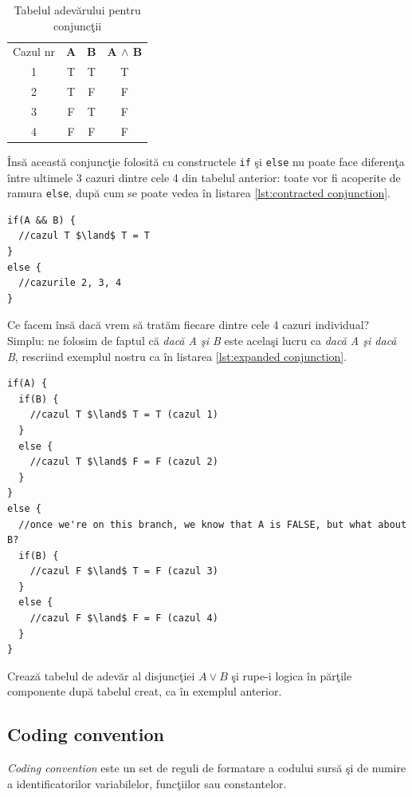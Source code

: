 \begin{table}[htp]
  \begin{center}
  \begin{tabular}{cccc}
  Cazul nr & \textbf{A} & \textbf{B} & \textbf{A $\land$ B}\\
  1 & T & T & T\\
  2 & T & F & F\\
  3 & F & T & F\\
  4 & F & F & F
  \end{tabular}
  \end{center}
  \caption{Tabelul adevărului pentru conjuncţii}
  \label{tbl:truth table and}
\end{table}

Însă această conjuncţie folosită cu constructele \texttt{if} şi
\texttt{else} nu poate face diferenţa între ultimele 3 cazuri dintre
cele 4 din tabelul anterior: toate vor fi acoperite de ramura \texttt{else}, după
cum se poate vedea în listarea \ref{lst:contracted conjunction}.

\begin{lstlisting}[float=htp,mathescape,label=lst:contracted conjunction,caption=O singură conjuncție]
if(A && B) {
  //cazul T $\land$ T = T
}
else {
  //cazurile 2, 3, 4
}
\end{lstlisting}

Ce facem însă dacă vrem să tratăm fiecare dintre cele 4 cazuri individual?
Simplu: ne folosim de faptul că \textit{dacă A şi B} este acelaşi lucru ca
\textit{dacă A şi dacă B}, rescriind exemplul nostru ca în listarea \ref{lst:expanded conjunction}.

\begin{lstlisting}[float=htp,mathescape,label=lst:expanded conjunction,caption=După extinderea conjuncției]
if(A) {
  if(B) {
    //cazul T $\land$ T = T (cazul 1)
  }
  else {
    //cazul T $\land$ F = F (cazul 2)
  }
}
else {
  //once we're on this branch, we know that A is FALSE, but what about B?
  if(B) {
    //cazul F $\land$ T = F (cazul 3)
  }
  else {
    //cazul F $\land$ F = F (cazul 4)
  }
}
\end{lstlisting}

\begin{Exercise}[title={Breaking down the logic of a disjunction},difficulty=1]
Crează tabelul de adevăr al disjuncţiei $A \lor B$ şi rupe-i logica în părţile
componente după tabelul creat, ca în exemplul anterior.
\end{Exercise}

\subsection{Coding convention}
\textsl{Coding convention} este un set de reguli de formatare a codului sursă
şi de numire a identificatorilor variabilelor, funcţiilor sau constantelor.

